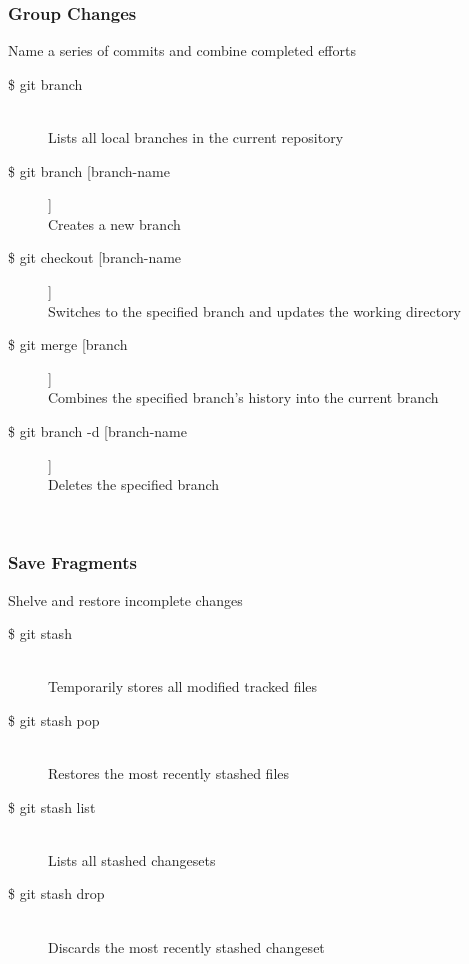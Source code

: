 \subsubsection{Group Changes}
Name a series of commits and combine completed efforts

\begin{description}

\item [\$ git branch] \leavevmode \\
Lists all local branches in the current repository

\item [\$ git branch [branch-name]]\\
Creates a new branch

\item [\$ git checkout [branch-name]]\\
Switches to the specified branch and updates the working directory

\item [\$ git merge [branch]]\\
Combines the specified branch’s history into the current branch

\item [\$ git branch -d [branch-name]]\\
Deletes the specified branch

\end{description}
\leavevmode \\


\subsubsection{Save Fragments}
Shelve and restore incomplete changes

\begin{description}

\item [\$ git stash] \leavevmode \\
Temporarily stores all modified tracked files

\item [\$ git stash pop] \leavevmode \\
Restores the most recently stashed files

\item [\$ git stash list] \leavevmode \\
Lists all stashed changesets

\item [\$ git stash drop] \leavevmode \\
Discards the most recently stashed changeset

\end{description}
\leavevmode \\


